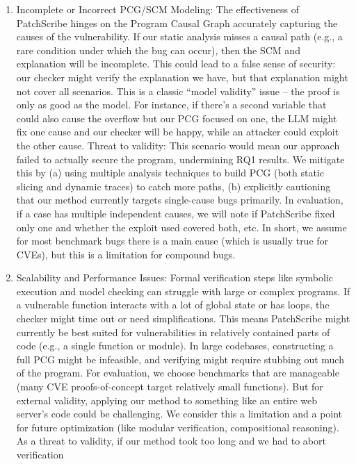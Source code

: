 \documentclass[conference,compsoc]{IEEEtran}
\begin{document}
\begin{enumerate}
\def\labelenumi{\arabic{enumi}.}
\item
  Incomplete or Incorrect PCG/SCM Modeling: The effectiveness of
  PatchScribe hinges on the Program Causal Graph accurately capturing
  the causes of the vulnerability. If our static analysis misses a
  causal path (e.g., a rare condition under which the bug can occur),
  then the SCM and explanation will be incomplete. This could lead to a
  false sense of security: our checker might verify the explanation we
  have, but that explanation might not cover all scenarios. This is a
  classic ``model validity'' issue -- the proof is only as good as the
  model. For instance, if there's a second variable that could also
  cause the overflow but our PCG focused on one, the LLM might fix one
  cause and our checker will be happy, while an attacker could exploit
  the other cause. Threat to validity: This scenario would mean our
  approach failed to actually secure the program, undermining RQ1
  results. We mitigate this by (a) using multiple analysis techniques to
  build PCG (both static slicing and dynamic traces) to catch more
  paths, (b) explicitly cautioning that our method currently targets
  single-cause bugs primarily. In evaluation, if a case has multiple
  independent causes, we will note if PatchScribe fixed only one and
  whether the exploit used covered both, etc. In short, we assume for
  most benchmark bugs there is a main cause (which is usually true for
  CVEs), but this is a limitation for compound bugs.
\item
  Scalability and Performance Issues: Formal verification steps like
  symbolic execution and model checking can struggle with large or
  complex programs. If a vulnerable function interacts with a lot of
  global state or has loops, the checker might time out or need
  simplifications. This means PatchScribe might currently be best suited
  for vulnerabilities in relatively contained parts of code (e.g., a
  single function or module). In large codebases, constructing a full
  PCG might be infeasible, and verifying might require stubbing out much
  of the program. For evaluation, we choose benchmarks that are
  manageable (many CVE proofs-of-concept target relatively small
  functions). But for external validity, applying our method to
  something like an entire web server's code could be challenging. We
  consider this a limitation and a point for future optimization (like
  modular verification, compositional reasoning). As a threat to
  validity, if our method took too long and we had to abort verification

\end{enumerate}
\end{document}
